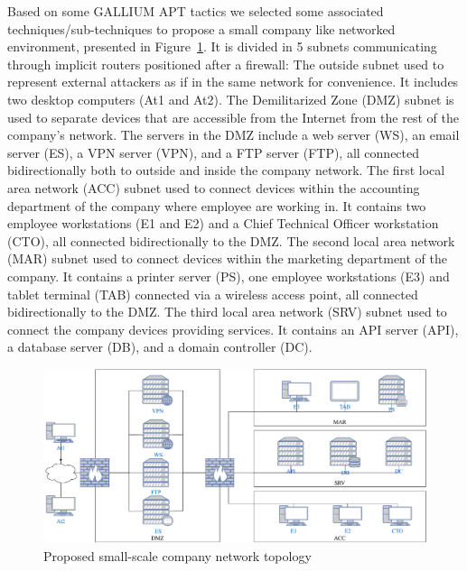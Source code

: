 \noindent
Based on some GALLIUM APT tactics we selected some associated techniques/sub-techniques to propose a small company like networked environment, presented in Figure~\ref{fig:scenario_network_topology}. It is divided in 5 subnets communicating through implicit routers positioned after a firewall:
The outside subnet used to represent external attackers as if in the same network for convenience. It includes two desktop computers (At1 and At2).
The Demilitarized Zone (DMZ) subnet is used to separate devices that are accessible from the Internet from the rest of the company's network. The servers in the DMZ include a web server (WS), an email server (ES), a VPN server (VPN), and a FTP server (FTP), all connected bidirectionally both to outside and inside the company network.
The first local area network (ACC) subnet used to connect devices within the accounting department of the company where employee are working in. It contains two employee workstations (E1 and E2) and a Chief Technical Officer workstation (CTO), all connected bidirectionally to the DMZ. %
The second local area network (MAR) subnet used to connect devices within the marketing department of the company. It contains a printer server (PS), one employee workstations (E3) and tablet terminal (TAB) connected via a wireless access point, all connected bidirectionally to the DMZ. %
The third local area network (SRV) subnet used to connect the company devices providing services. It contains an API server (API), a database server (DB), and a domain controller (DC).

\begin{figure}
    \centering
    \includegraphics[width=\linewidth]{figures/topology.pdf}
    \caption{Proposed small-scale company network topology}
    \label{fig:scenario_network_topology}
\end{figure}


